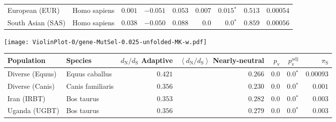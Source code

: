 \begin{center}
\begin{adjustbox}{width = 1\textwidth}
\begin{tabular}{|l|l|r|r|r|r|r|r|r|}
                 European (EUR) &         Homo sapiens &                                        $ 0.001$ &                                           $-0.051$ &                      $ 0.053$ &         $ 0.007$ &               $\bm{ 0.015{^*}}$ &                                           $ 0.513$ &          $0.00054$ \\
              South Asian (SAS) &         Homo sapiens &                                        $ 0.038$ &                                           $-0.050$ &                      $ 0.088$ &            $0.0$ &                  $\bm{0.0{^*}}$ &                                           $ 0.859$ &          $0.00056$ \\
\bottomrule
\end{tabular}
\end{adjustbox}
\newpage
\texttt{[image: ViolinPlot-0/gene-MutSel-0.025-unfolded-MK-w.pdf]} 
\begin{adjustbox}{width = 1\textwidth}
\begin{tabular}{|l|l|r|r|r|r|r|}
\toprule
                     Population &              Species & \specialcell{$d_{\mathrm{N}} / d_{\mathrm{S}}$ \\ Adaptive} & \specialcell{$\left< d_{\mathrm{N}} / d_{\mathrm{S}} \right>$ \\ Nearly-neutral} & $p_{\mathrm{v}}$ & $p_{\mathrm{v}}^{\mathrm{adj}}$ & $\pi_{\textrm{S}}$ \\
\midrule
                Diverse (Equus) &       Equus caballus &                                           $ 0.421$ &                                           $ 0.266$ &            $0.0$ &                  $\bm{0.0{^*}}$ &          $0.00093$ \\
                Diverse (Canis) &     Canis familiaris &                                           $ 0.356$ &                                           $ 0.230$ &            $0.0$ &                  $\bm{0.0{^*}}$ &           $ 0.001$ \\
                    Iran (IRBT) &           Bos taurus &                                           $ 0.353$ &                                           $ 0.282$ &            $0.0$ &                  $\bm{0.0{^*}}$ &           $ 0.003$ \\
                  Uganda (UGBT) &           Bos taurus &                                           $ 0.356$ &                                           $ 0.279$ &            $0.0$ &                  $\bm{0.0{^*}}$ &           $ 0.003$ \\

\end{tabular}
\end{adjustbox}
\end{center}
